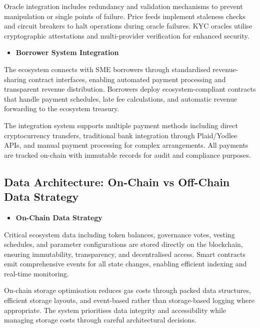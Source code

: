 \documentclass[
  paper=a4,
  ,captions=tableheading
]{scrartcl}
\providecommand{\tightlist}{%
  \setlength{\itemsep}{0pt}\setlength{\parskip}{0pt}}
\begin{document}
Oracle integration includes redundancy and validation mechanisms to
prevent manipulation or single points of failure. Price feeds implement
staleness checks and circuit breakers to halt operations during oracle
failures. KYC oracles utilise cryptographic attestations and
multi-provider verification for enhanced security.

\begin{itemize}
\tightlist
\item
  \textbf{Borrower System Integration}
\end{itemize}

The ecosystem connects with SME borrowers through standardised
revenue-sharing contract interfaces, enabling automated payment
processing and transparent revenue distribution. Borrowers deploy
ecosystem-compliant contracts that handle payment schedules, late fee
calculations, and automatic revenue forwarding to the ecosystem treasury.

The integration system supports multiple payment methods including
direct cryptocurrency transfers, traditional bank integration through
Plaid/Yodlee APIs, and manual payment processing for complex
arrangements. All payments are tracked on-chain with immutable records
for audit and compliance purposes.

\subsection{Data Architecture: On-Chain vs Off-Chain Data
Strategy}\label{data-architecture-on-chain-vs-off-chain-data-strategy}

\begin{itemize}
\tightlist
\item
  \textbf{On-Chain Data Strategy}
\end{itemize}

Critical ecosystem data including token balances, governance votes,
vesting schedules, and parameter configurations are stored directly on
the blockchain, ensuring immutability, transparency, and decentralised
access. Smart contracts emit comprehensive events for all state changes,
enabling efficient indexing and real-time monitoring.

On-chain storage optimisation reduces gas costs through packed data
structures, efficient storage layouts, and event-based rather than
storage-based logging where appropriate. The system prioritises data
integrity and accessibility while managing storage costs through careful
architectural decisions.
\end{document}
